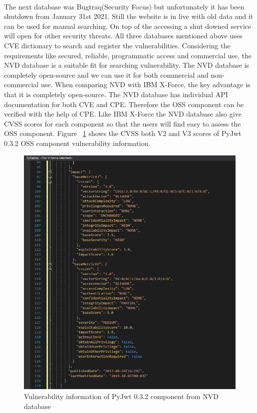 \paragraph{}
The next database was Bugtraq(Security Focus) but unfortunately it has been shutdown from January 31st 2021\cite{Cat2021}. Still the website is in live with old data and it can be used for manual searching. On top of the accessing a shut downed service will open for other security threats. All three databases mentioned above uses \acs{CVE} dictionary to search and register the vulnerabilities. Considering the requirements like secured, reliable, programmatic access and commercial use, the \acs{NVD} database is a suitable fit for searching vulnerability. The \acs{NVD} database is completely open-source and we can use it for both commercial and non-commercial use. When comparing \acs{NVD} with IBM X-Force, the key advantage is that it is completely open-source. The \acs{NVD} database has individual API documentation for both \acs{CVE} and \acs{CPE}. Therefore the \acs{OSS} component can be verified with the help of \acs{CPE}. Like IBM X-Force the \acs{NVD} database also give \acs{CVSS} scores for each component so that the users will find easy to assess the \acs{OSS} component. Figure ~\ref{fig:nvdOutput} shows the \acs{CVSS} both V2 and V3 scores of PyJwt 0.3.2 \acs{OSS} component vulnerability information. 
\begin{figure}[H]
	\includegraphics[width=15cm]{includes/nvdOutput.PNG}
	\centering
	\caption{Vulnerability information of PyJwt 0.3.2 component from \acs{NVD} database}
	\label{fig:nvdOutput}
\end{figure}
